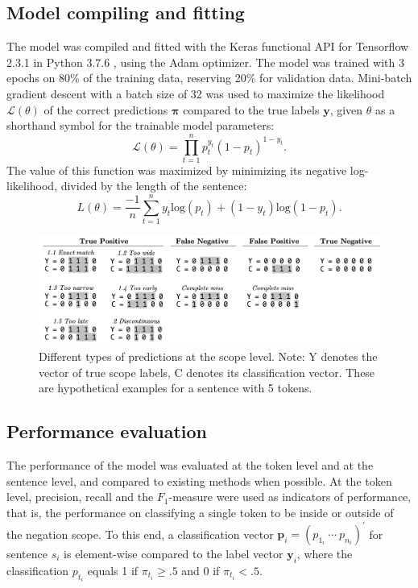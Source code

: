 \documentclass{article}
\begin{document}
\begin{multicols}{2}
\subsection{Model compiling and fitting}

The model was compiled and fitted with the Keras functional API for Tensorflow 2.3.1 in Python 3.7.6 \citep{tensorflow, python}, using the Adam optimizer. The model was trained with 3 epochs on 80\% of the training data, reserving 20\% for validation data. Mini-batch gradient descent with a batch size of 32 was used to maximize the likelihood $\mathcal{L}(\theta)$ of the correct predictions $\boldsymbol{\pi}$ compared to the true labels $\mathbf{y}$, given $\theta$ as a shorthand symbol for the trainable model parameters: $$\mathcal{L}(\theta)=\prod_{t=1}^{n} p_{t}^{y_{t}} (1-p_{t})^{1-y_{t}}.$$ The value of this function was maximized by minimizing its negative log-likelihood, divided by the length of the sentence: $$L(\theta)=\frac{-1}{n}\sum_{t=1}^{n} y_{t} \mathrm{log}(p_{t}) + (1-y_{t})\mathrm{log}(1-p_{t}).$$

\begin{figure}[]
	\centering
	\includegraphics[scale=0.66]{prediction types}
\caption{Different types of predictions at the scope level. Note: Y denotes the vector of true scope labels, C denotes its classification vector. These are hypothetical examples for a sentence with 5 tokens.}
\label{scopelevel}
\end{figure}

\subsection{Performance evaluation}
The performance of the model was evaluated at the token level and at the sentence level, and compared to existing methods when possible. At the token level, precision, recall and the $F_1$-measure were used as indicators of performance\footnotemark, that is, the performance on classifying a single token to be inside or outside of the negation scope. To this end, a classification vector $\mathbf{p}_i = (p_{1_i}~\cdots~p_{n_i})^{\prime}$ for sentence $s_i$ is element-wise compared to the label vector $\mathbf{y}_i$, where the classification $p_{t_i}$ equals 1 if $\pi_{t_i}\ge.5$ and 0 if $\pi_{t_i}<.5$. 


\end{multicols}
\end{document}
